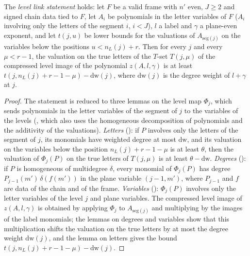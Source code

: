 \begin{proposition}\label{pf:linkG:link}
The \emph{level link statement} holds: let $F$ be a valid frame with $n'$ even, $J\ge2$ and signed chain data tied to $F$,
let $A_i$ be polynomials in the letter variables of $F$ ($A_i$ involving only the letters of the segment $i$, $i<J$), $l$ a
label and $\gamma$ a plane-even exponent, and let $t(j,u)$ be lower bounds for the valuations of $A_{\mathrm{seg}(j)}$ on the
variables below the positions $u<n_L(j)+r$. Then for every $j$ and every $\mu<r-1$, the valuation on the true letters of the
$T$-set $T(j,\mu)$ of the compressed level image of the polynomial $z(A,l,\gamma)$ is at least
$t(j,n_L(j)+r-1-\mu)-\mathrm{dw}(j)$, where $\mathrm{dw}(j)$ is the degree weight of $l+\gamma$ at $j$.
\end{proposition}

\begin{proof}
The statement is reduced to three lemmas on the level map $\Phi_j$, which sends polynomials in the letter variables of the
segment of $j$ to the variables of the levels
(, which also uses the homogeneous decomposition of
polynomials and the additivity of the valuations).
\emph{Letters} (): if $P$ involves only the letters of the
segment of $j$, its monomials have weighted degree at most $\mathrm{dw}$, and its valuation on the variables below the
position $n_L(j)+r-1-\mu$ is at least $\theta$, then the valuation of $\Phi_j(P)$ on the true letters of $T(j,\mu)$ is at least
$\theta-\mathrm{dw}$. \emph{Degrees} (): if $P$ is homogeneous of
multidegree $\delta$, every monomial of $\Phi_j(P)$ has degree $P_{j-1}(m')\,\delta(f(m'))$ in the plane variable $(j-1,m')$, where
$P_{j-1}$ and $f$ are data of the chain and of the frame. \emph{Variables}
(): $\Phi_j(P)$ involves only the letter variables of the level $j$
and plane variables. The compressed level image of $z(A,l,\gamma)$ is obtained by applying $\Phi_j$ to $A_{\mathrm{seg}(j)}$ and
multiplying by the images of the label monomials; the lemmas on degrees and variables show that this multiplication shifts
the valuation on the true letters by at most the degree weight $\mathrm{dw}(j)$, and the lemma on letters gives the bound
$t(j,n_L(j)+r-1-\mu)-\mathrm{dw}(j)$.
\end{proof}

